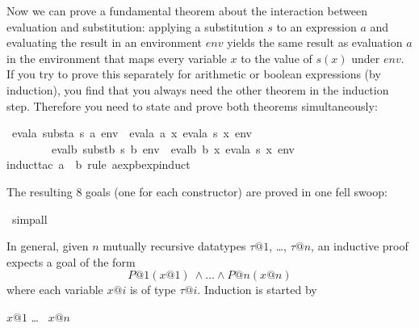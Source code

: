 \begin{isabellebody}
\begin{isamarkuptext}
Now we can prove a fundamental theorem about the interaction between
evaluation and substitution: applying a substitution $s$ to an expression $a$
and evaluating the result in an environment $env$ yields the same result as
evaluation $a$ in the environment that maps every variable $x$ to the value
of $s(x)$ under $env$. If you try to prove this separately for arithmetic or
boolean expressions (by induction), you find that you always need the other
theorem in the induction step. Therefore you need to state and prove both
theorems simultaneously:%
\end{isamarkuptext}%
\isamarkuptrue%
\isamarkupfalse%
\ {\isachardoublequoteopen}evala\ {\isacharparenleft}substa\ s\ a{\isacharparenright}\ env\ {\isacharequal}\ evala\ a\ {\isacharparenleft}{\isasymlambda}x{\isachardot}\ evala\ {\isacharparenleft}s\ x{\isacharparenright}\ env{\isacharparenright}\ {\isasymand}\isanewline
\ \ \ \ \ \ \ \ evalb\ {\isacharparenleft}substb\ s\ b{\isacharparenright}\ env\ {\isacharequal}\ evalb\ b\ {\isacharparenleft}{\isasymlambda}x{\isachardot}\ evala\ {\isacharparenleft}s\ x{\isacharparenright}\ env{\isacharparenright}{\isachardoublequoteclose}\isanewline
%
\isadelimproof
%
\endisadelimproof
%
\isatagproof
{}\isamarkupfalse%
{\isacharparenleft}induct{\isacharunderscore}tac\ a\ \ b\ rule{\isacharcolon}\ aexp{\isacharunderscore}bexp{\isachardot}induct{\isacharparenright}%
\begin{isamarkuptxt}%
\noindent
The resulting 8 goals (one for each constructor) are proved in one fell swoop:%
\end{isamarkuptxt}%
\isamarkuptrue%
\isamarkupfalse%
\ simp{\isacharunderscore}all%
\endisatagproof
{\isafoldproof}%
%
\isadelimproof
%
\endisadelimproof
%
\begin{isamarkuptext}%
In general, given $n$ mutually recursive datatypes $\tau@1$, \dots, $\tau@n$,
an inductive proof expects a goal of the form
\[ P@1(x@1)\ \land \dots \land P@n(x@n) \]
where each variable $x@i$ is of type $\tau@i$. Induction is started by
\begin{isabelle}
 $x@1$  \dots\  $x@n$\isa{{\isacharparenright}}
\end{isabelle}


\end{isamarkuptext}
\end{isabellebody}

